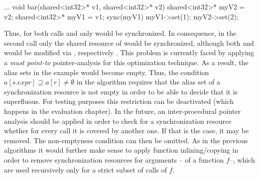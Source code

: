 \begin{ccode}
...
void bar(shared<int32>* v1, shared<int32>* v2) { 
  shared<int32>* myV2 = v2; 
  shared<int32>* myV1 = v1;
  sync(myV1) { 
    myV1->set(1); 
    myV2->set(2); 
  } 
}
\end{ccode}
Thus, for both calls  and  only  would be synchronized. In consequence, in the second call only the shared resource of  would be synchronized, although both  and  would be modified via , respectively . This problem is currently faced by applying a \textit{must point-to} pointer-analysis for this optimization technique. As a result, the alias sets in the example would become empty. Thus, the condition $a[s.\mathit{expr}] \supseteq a[r] \neq \emptyset$ in the algorithm requires that the alias set of a synchronization resource is not empty in order to be able to decide that it is superfluous. For testing purposes this restriction can be deactivated (which happens in the evaluation chapter). In the future, an inter-procedural pointer analysis should be applied in order to check for a synchronization resource whether for every call it is covered by another one. If that is the case, it may be removed. The non-emptyness condition can then be omitted. As in the previous algorithms it would further make sense to apply function inlining/copying in order to remove synchronization resources for arguments -- of a function $f$--, which are used recursively only for a strict subset of calls of $f$. 

